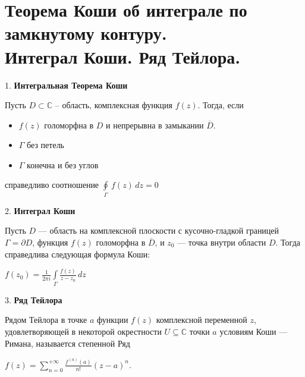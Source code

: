 \section{
    Теорема Коши об интеграле по замкнутому контуру. \\
    Интеграл Коши. Ряд Тейлора.
}

1. \textbf{Интегральная Теорема Коши}

Пусть ${\displaystyle D\subset \mathbb {C} }$ -- область, комплексная функция ${\displaystyle f(z)}$.
Тогда, если 
\begin{itemize}
    \item ${\displaystyle f(z)}$ голоморфна в ${\displaystyle D}$ и непрерывна в замыкании ${\displaystyle {\overline {D}}}$. 
    \item ${\displaystyle \Gamma}$ без петель
    \item ${\displaystyle \Gamma}$ конечна и без углов
\end{itemize}   
 справедливо соотношение 
${\displaystyle \oint \limits _{\Gamma }\,f(z)\,dz=0}$

2. \textbf{Интеграл Коши}

Пусть ${\displaystyle D}$ — область на комплексной плоскости с кусочно-гладкой границей 
${\displaystyle \Gamma =\partial D}$, функция ${\displaystyle f(z)}$ голоморфна в 
${\displaystyle {\overline {D}}}$, и ${\displaystyle z_{0}}$ — точка внутри области 
${\displaystyle D}$. Тогда справедлива следующая формула Коши:

${\displaystyle f(z_{0})={\frac {1}{2\pi i}}\int \limits _{\Gamma }{\frac {f(z)}{z-z_{0}}}\,dz}$

3. \textbf{Ряд Тейлора}

Рядом Тейлора в точке ${\displaystyle a}$ функции ${\displaystyle f(z)}$ комплексной переменной 
${\displaystyle z}$, удовлетворяющей в некоторой окрестности ${\displaystyle U\subseteq \mathbb {C}}$
точки ${\displaystyle a}$ условиям Коши — Римана, называется степенной Ряд

${\displaystyle f(z)=\sum _{n=0}^{+\infty }{\frac {f^{(n)}(a)}{n!}}(z-a)^{n}}.$